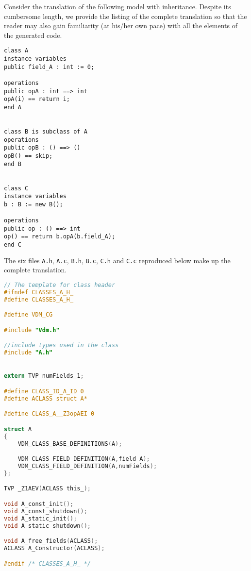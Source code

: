 Consider the translation of the following model with inheritance.
%
Despite its cumbersome length, we provide the listing of the complete translation so that the reader may also gain familiarity (at his/her own pace) with all the elements of the generated code.
%
%
%
\begin{lstlisting}[language=VDM++,frame=tlbr]
class A
instance variables
public field_A : int := 0;

operations
public opA : int ==> int
opA(i) == return i;
end A


class B is subclass of A
operations
public opB : () ==> ()
opB() == skip;
end B


class C
instance variables
b : B := new B();

operations
public op : () ==> int
op() == return b.opA(b.field_A);
end C
\end{lstlisting}
%
%
%
The six files \texttt{A.h}, \texttt{A.c}, \texttt{B.h}, \texttt{B.c}, \texttt{C.h} and \texttt{C.c} reproduced below make up the complete translation.
%
%
%
\begin{lstlisting}[language=C,frame=tlbr,caption="File A.h."]
// The template for class header
#ifndef CLASSES_A_H_
#define CLASSES_A_H_

#define VDM_CG

#include "Vdm.h"

//include types used in the class
#include "A.h"


extern TVP numFields_1;

#define CLASS_ID_A_ID 0
#define ACLASS struct A*

#define CLASS_A__Z3opAEI 0

struct A
{
	VDM_CLASS_BASE_DEFINITIONS(A);

	VDM_CLASS_FIELD_DEFINITION(A,field_A);
	VDM_CLASS_FIELD_DEFINITION(A,numFields);
};

TVP _Z1AEV(ACLASS this_);

void A_const_init();
void A_const_shutdown();
void A_static_init();
void A_static_shutdown();

void A_free_fields(ACLASS);
ACLASS A_Constructor(ACLASS);

#endif /* CLASSES_A_H_ */

\end{lstlisting}
%
%
%
